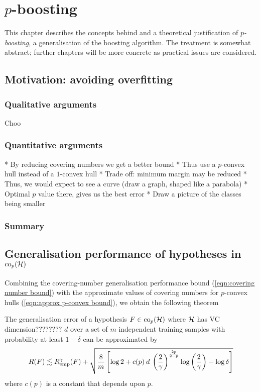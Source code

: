
\chapter{$p$-boosting}

This chapter describes the concepts behind and a theoretical
justification of \emph{$p$-boosting}, a generalisation of the boosting
algorithm.  The treatment is somewhat abstract; further chapters will
be more concrete as practical issues are considered.

\section{Motivation: avoiding overfitting}



\subsection{Qualitative arguments}

Choo

\subsection{Quantitative arguments}
* By reducing covering numbers we get a better bound
* Thus use a $p$-convex hull instead of a $1$-convex hull
* Trade off: minimum margin may be reduced
* Thus, we would expect to see a curve (draw a graph, shaped like a parabola)
* Optimal $p$ value there, gives us the best error
* Draw a picture of the classes being smaller

\subsection{Summary}

\section{Generalisation performance of hypotheses in $\mathrm{co}_p(\mathcal{H})$}

Combining the covering-number generalisation performance bound
(\ref{eqn:covering number bound}) with the approximate values of
covering numbers for $p$-convex hulls (\ref{eqn:approx p-convex
bound}), we obtain the following theorem

\begin{theorem}
The generalisation error of a hypothesis $F \in \mathrm{co}_p(\mathcal{H})$ where
$\mathcal{H}$ has VC dimension???????? $d$ over a set of $m$ independent training
samples with probability at least $1 - \delta$ can be approximated by
%
\begin{equation}
R(F) \lesssim R_{\mathrm{emp}}^{\gamma}(F) + \sqrt{ \frac{8}{m} \left[ \log 2
+ c(p) \: d \: \left( \frac{2}{\gamma} \right)^{\frac{2p}{2-p}} \log
\left( \frac{2}{\gamma} \right) - \log \delta \right]}
\end{equation}
where $c(p)$ is a constant that depends upon $p$. 
%
\end{theorem}

